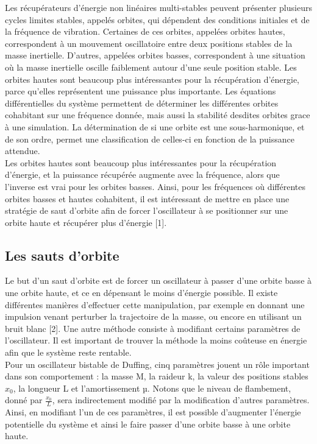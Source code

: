 \documentclass[a4paper, french, 12pt, titlepage]{article}
\begin{document}
Les récupérateurs d'énergie non linéaires multi-stables peuvent présenter plusieurs cycles limites stables, appelés orbites, qui dépendent des conditions initiales et de la fréquence de vibration. Certaines de ces orbites, appelées orbites hautes, correspondent à un mouvement oscillatoire entre deux positions stables de la masse inertielle. D'autres, appelées orbites basses, correspondent à une situation où la masse inertielle oscille faiblement autour d'une seule position stable. Les orbites hautes sont beaucoup plus intéressantes pour la récupération d'énergie, parce qu'elles représentent une puissance plus importante. Les équations différentielles du système permettent de déterminer les différentes orbites cohabitant sur une fréquence donnée, mais aussi la stabilité desdites orbites grace à une simulation. La détermination de si une orbite est une sous-harmonique, et de son ordre, permet une classification de celles-ci en fonction de la puissance attendue. \\

Les orbites hautes sont beaucoup plus intéressantes pour la récupération d'énergie, et la puissance récupérée augmente avec la fréquence, alors que l'inverse est vrai pour les orbites basses. Ainsi, pour les fréquences où différentes orbites basses et hautes cohabitent, il est intéressant de mettre en place une stratégie de saut d'orbite afin de forcer l'oscillateur à se positionner sur une orbite haute et récupérer plus d'énergie [1]. \\


\subsection{Les sauts d'orbite}

Le but d'un saut d'orbite est de forcer un oscillateur à passer d'une orbite basse à une orbite haute, et ce en dépensant le moins d'énergie possible. Il existe différentes manières d'effectuer cette manipulation, par exemple en donnant une impulsion venant perturber la trajectoire de la masse, ou encore en utilisant un bruit blanc [2]. Une autre méthode consiste à modifiant certains paramètres de l'oscillateur. Il est important de trouver la méthode la moins coûteuse en énergie afin que le système reste rentable. \\

Pour un oscillateur bistable de Duffing, cinq paramètres jouent un rôle important dans son comportement : la masse M, la raideur k, la valeur des positions stables $x_0$, la longueur L et l'amortissement µ. Notons que le niveau de flambement, donné par $\frac{x_0}{L}$, sera indirectement modifié par la modification d'autres paramètres. Ainsi, en modifiant l'un de ces paramètres, il est possible d'augmenter l'énergie potentielle du système et ainsi le faire passer d'une orbite basse à une orbite haute. \\
\end{document}
